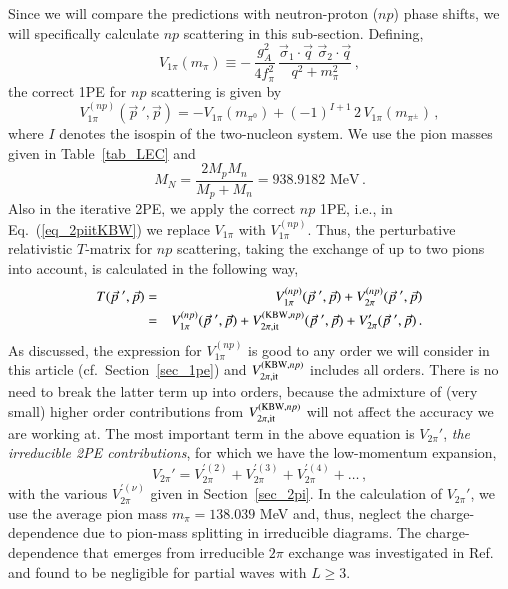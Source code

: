 \documentclass[sort&compress,preprint,3p]{elsarticle}
\begin{document}
Since we will compare the predictions with neutron-proton ($np$) phase shifts,
we will specifically calculate $np$ scattering in this sub-section.
Defining,
\begin{equation}
V_{1\pi} (m_\pi) \equiv -\, 
\frac{g_A^2}{4f_\pi^2}\, \frac{
\vec \sigma_1 \cdot \vec q \,\, \vec \sigma_2 \cdot \vec q}
{q^2 + m_\pi^2} 
\,,
\label{eq_1pe_bare}
\end{equation}
the correct 1PE for $np$ scattering is given by
\begin{equation}
V_{1\pi}^{(np)} ({\vec p}~', \vec p) 
= -V_{1\pi}(m_{\pi^0}) + (-1)^{I+1}\, 2\, V_{1\pi} (m_{\pi^\pm})
\,,
\label{eq_1penp}
\end{equation}
where $I$ denotes the isospin of the two-nucleon system.
We use the pion masses given in Table~\ref{tab_LEC} and
\begin{equation}
M_N  =  \frac{2M_pM_n}{M_p+M_n} = 938.9182 \mbox{ MeV}
\,.
\end{equation}
Also in the iterative 2PE, we apply the correct $np$
1PE, i.e., in Eq.~(\ref{eq_2piitKBW}) we replace $V_{1\pi}$
with $V_{1\pi}^{(np)}$.
Thus, the perturbative relativistic $T$-matrix for $np$ scattering,
taking the exchange of up to two pions into account,
is calculated in the following way,
\begin{eqnarray}
T({\vec p}~',\vec p) &=& 
 V_{1\pi}^{(np)} ({\vec p}~', \vec p) +
 V_{2\pi}^{(np)} ({\vec p}~', \vec p) 
\nonumber \\
      &=&
 V_{1\pi}^{(np)} ({\vec p}~', \vec p) +
 V_{2\pi, \rm it}^{({\rm KBW},np)} 
({\vec p}~',{\vec p}) +
 V_{2\pi}'({\vec p}~',{\vec p}) 
\,.
\label{eq_tall}
\end{eqnarray}
As discussed, the expression for $V_{1\pi}^{(np)}$ is good to any order
we will consider in this article (cf.\ 
Section~\ref{sec_1pe}) and 
$V_{2\pi, \rm it}^{({\rm KBW},np)}$ 
includes all orders.
There is no need to break the latter term
up into orders, because
the admixture of (very small) higher order contributions from 
$V_{2\pi, \rm it}^{({\rm KBW},np)}$ 
will not affect the accuracy we are working at.
The most important term in the above equation is
$V_{2\pi}'$, 
{\it the irreducible 2PE contributions}, 
for which we have the low-momentum expansion,
\begin{equation}
V_{2\pi}' = 
V_{2\pi}^{'(2)} +
V_{2\pi}^{'(3)} +
V_{2\pi}^{'(4)} 
+ \ldots 
\,,
\end{equation}
with the various 
$V_{2\pi}^{'(\nu)}$ 
given in Section~\ref{sec_2pi}.
In the calculation of 
$V_{2\pi}'$, 
we use the average pion mass $m_\pi = 138.039$ MeV and, thus,
neglect the charge-dependence due to pion-mass splitting
in irreducible diagrams.
The charge-dependence that emerges from irreducible $2\pi$ 
exchange was investigated in Ref.~\cite{LM98b} and found to be
negligible for partial waves with $L\geq 3$.
\end{document}
